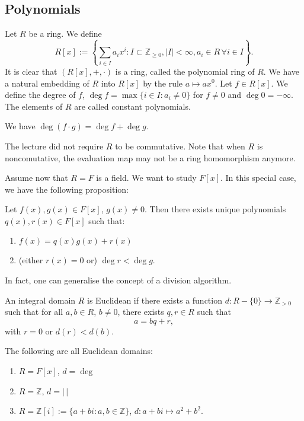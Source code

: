 \documentclass{scrartcl}
\def\ge{\geqslant}
\def\Z{\mathbb{Z}}
\begin{document}
\subsection{Polynomials}
Let $R$ be a ring. We define
\[ R[x] := \left\{\sum_{i \in I}a_ix^i : I \subset \Z_{\ge 0}, |I|<\infty, a_i \in R \, \forall i \in I\right\}.\]
It is clear that $(R[x], +, \cdot)$ is a ring, called the polynomial ring of $R$. We have a natural embedding of $R$ into $R[x]$ by the rule $a \mapsto ax^0$.
Let $f \in R[x]$. We define the degree of $f$, $\deg{f} = \max\{i\in I : a_i \ne 0\}$ for $f \ne 0$ and $\deg{0} = -\infty$. The elements of $R$ are called constant polynomials. 
\begin{remark}
	We have $\deg(f\cdot g) = \deg{f}+\deg{g}$.
\end{remark}
\begin{remark}
	The lecture did not require $R$ to be commutative. Note that when $R$ is noncomutative, the evaluation map may not be a ring homomorphism anymore. 
\end{remark}
Assume now that $R=F$ is a field. We want to study $F[x]$. In this special case, we have the following proposition:
\begin{proposition}
	Let $f(x), g(x) \in F[x]$, $g(x) \ne 0$. Then there exists unique polynomials $q(x), r(x) \in F[x]$ such that:
	\begin{enumerate}
		\item $f(x) = q(x)g(x)+r(x)$
		\item (either $r(x)=0$ or) $\deg{r}<\deg{g}$.
	\end{enumerate}
\end{proposition}
In fact, one can generalise the concept of a division algorithm. 
\begin{definition}
	An integral domain $R$ is Euclidean if there exists a function $d:R-\{0\} \to \Z_{>0}$ such that for all $a, b \in R$, $b \ne 0$, there exists $q, r \in R$ such that
	\[a = bq+r, \]
	with $r=0$ or $d(r) < d(b)$.
\end{definition}
\begin{example}
	The following are all Euclidean domains:
	\begin{enumerate}
		\item $R=F[x]$, $d=\deg$
		\item $R=\Z$, $d=|\,|$
		\item $R=\Z[i] := \{a+bi:a, b\in \Z\}$, $d: a+bi \mapsto a^2+b^2$.
	\end{enumerate}
\end{example}
\end{document}
